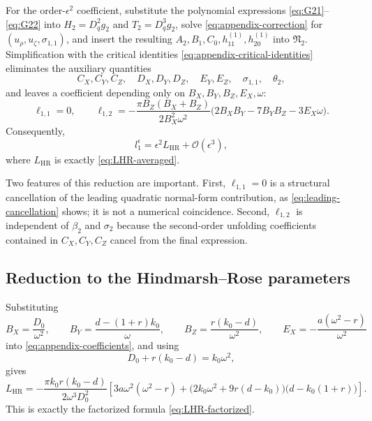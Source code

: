 \documentclass[11pt]{amsart}
\theoremstyle{remark}
\newcommand{\cO}{\mathcal{O}}
\newcommand{\LHR}{L_{\mathrm{HR}}}
\begin{document}
For the order-\(\epsilon^2\) coefficient, substitute the polynomial
expressions \eqref{eq:G21}--\eqref{eq:G22} into
\(H_2=D_q^2g_2\) and \(T_2=D_q^3g_2\), solve
\eqref{eq:appendix-correction} for
\((u_\rho,u_\zeta,\sigma_{1,1})\), and insert the resulting
\(A_2,B_1,C_0,h_{11}^{(1)},h_{20}^{(1)}\) into
\(\mathfrak N_2\).  Simplification with the critical identities
\eqref{eq:appendix-critical-identities} eliminates the auxiliary quantities
\[
 C_X,C_Y,C_Z,\quad D_X,D_Y,D_Z,\quad E_Y,E_Z,\quad
 \sigma_{1,1},\quad \theta_2,
\]
and leaves a coefficient depending only on
\(B_X,B_Y,B_Z,E_X,\omega\):
\begin{equation}\label{eq:appendix-coefficients}
\ell_{1,1}=0,\qquad
\ell_{1,2}
=-\frac{\pi B_Z(B_X+B_Z)}{2B_X^2\omega^2}
\bigl(2B_XB_Y-7B_YB_Z-3E_X\omega\bigr).
\end{equation}
Consequently,
\[
 l_1^\epsilon=\epsilon^2\LHR+\cO(\epsilon^3),
\]
where \(\LHR\) is exactly \eqref{eq:LHR-averaged}.

Two features of this reduction are important.  First,
\(\ell_{1,1}=0\) is a structural cancellation of the leading quadratic
normal-form contribution, as \eqref{eq:leading-cancellation} shows; it is not
a numerical coincidence.  Second, \(\ell_{1,2}\) is independent of
\(\beta_2\) and \(\sigma_2\) because the second-order unfolding coefficients
contained in \(C_X,C_Y,C_Z\) cancel from the final expression.

\subsection{Reduction to the Hindmarsh--Rose parameters}

Substituting
\[
 B_X=\frac{D_0}{\omega^2},\qquad
 B_Y=\frac{d-(1+r)k_0}{\omega},\qquad
 B_Z=\frac{r(k_0-d)}{\omega^2},\qquad
 E_X=-\frac{a(\omega^2-r)}{\omega^2}
\]
into \eqref{eq:appendix-coefficients}, and using
\[
 D_0+r(k_0-d)=k_0\omega^2,
\]
gives
\[
\LHR
=-\frac{\pi k_0r(k_0-d)}{2\omega^3D_0^2}
\left[
3a\omega^2(\omega^2-r)
+\bigl(2k_0\omega^2+9r(d-k_0)\bigr)
\bigl(d-k_0(1+r)\bigr)
\right].
\]
This is exactly the factorized formula \eqref{eq:LHR-factorized}.
\end{document}
